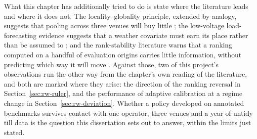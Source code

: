 What this chapter has additionally tried to do is state where the literature
leads and where it does not. The locality--globality principle, extended by
analogy, suggests that pooling across three venues will buy little
\citep{montero-manso_principles_2021}; the low-voltage load-forecasting evidence
suggests that a weather covariate must earn its place rather than be assumed to
\citep{haben_short_2019,hertel_explainable_2026}; and the rank-stability
literature warns that a ranking computed on a handful of evaluation origins
carries little information, without predicting which way it will move
\citep{hewamalage_look_2021,brigato_there_2025}. Against those, two of this
project's observations run the other way from the chapter's own reading of the
literature, and both are marked where they arise: the direction of the ranking
reversal in Section~\ref{sec:rw-ruler}, and the performance of adaptive
calibration at a regime change in Section~\ref{sec:rw-deviation}. Whether a
policy developed on annotated benchmarks survives contact with one operator,
three venues and a year of untidy till data is the question this dissertation
sets out to answer, within the limits just stated.
